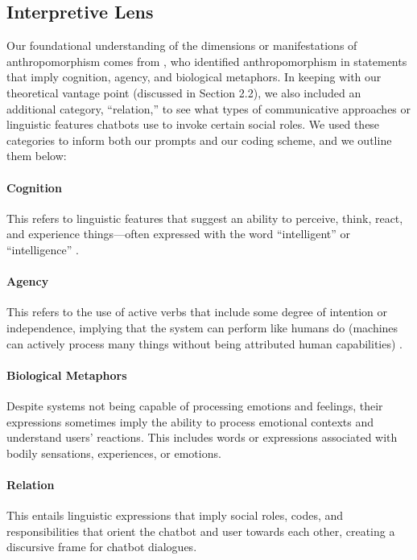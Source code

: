\subsection{Interpretive Lens}


Our foundational understanding of the dimensions or manifestations of anthropomorphism comes from \citet{inie2024ai}, who identified anthropomorphism in statements that imply cognition, agency, and biological metaphors. In keeping with our theoretical vantage point (discussed in Section 2.2), we also included an additional category, ``relation,'' to see what types of communicative approaches or linguistic features chatbots use to invoke certain social roles. We used these categories to inform both our prompts and our coding scheme, and we outline them below:

\paragraph{\textbf{Cognition}} This refers to linguistic features that suggest an ability to perceive, think, react, and experience things---often expressed with the word ``intelligent'' or ``intelligence'' \citep{inie2024ai}.

\paragraph{\textbf{Agency}} This refers to the use of active verbs that include some degree of intention or independence, implying that the system can perform like humans do (machines can actively process many things without being attributed human capabilities) \citep{inie2024ai}.

\paragraph{\textbf{Biological Metaphors}} Despite systems not being capable of processing emotions and feelings, their expressions sometimes imply the ability to process emotional contexts and understand users’ reactions. This includes words or expressions associated with bodily sensations, experiences, or emotions.

\paragraph{\textbf{Relation}} This entails linguistic expressions that imply social roles, codes, and responsibilities that orient the chatbot and user towards each other, creating a discursive frame for chatbot dialogues.

